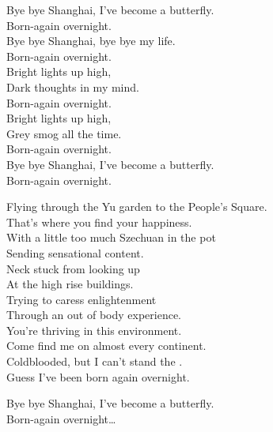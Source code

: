 
Bye bye Shanghai, I've become a butterfly. \\
Born-again overnight. \\
Bye bye Shanghai, bye bye my life. \\
Born-again overnight. \\

Bright lights up high, \\
Dark thoughts in my mind. \\
Born-again overnight. \\

Bright lights up high, \\
Grey smog all the time. \\
Born-again overnight. \\

Bye bye Shanghai, I've become a butterfly. \\
Born-again overnight. \\


Flying through the Yu garden to the People's Square. \\
That's where you find your happiness. \\
With a little too much Szechuan in the pot \\
Sending sensational content. \\

Neck stuck from looking up \\
At the high rise buildings. \\
Trying to caress enlightenment \\
Through an out of body experience. \\

You're thriving in this environment. \\
Come find me on almost every continent. \\
Coldblooded, but I can't stand the . \\
Guess I've been born again overnight. \\


Bye bye Shanghai, I've become a butterfly. \\
Born-again overnight… \\


